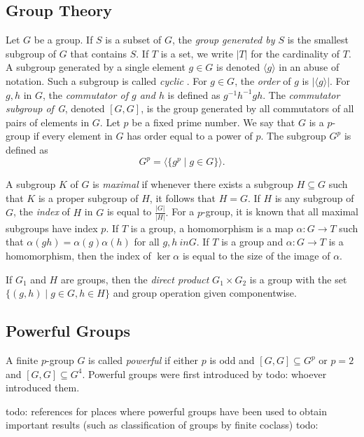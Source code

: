 \documentclass{amsart}
\numberwithin{equation} {section}
\theoremstyle{definition}
\begin{document}
\subsection{Group Theory}

Let $G$ be a group. If $S$ is a subset of $G$, the \textit{group generated by $S$} is the smallest subgroup of $G$ that contains $S$. If $T$ is a set, we write $|T|$ for the cardinality of $T$. A subgroup generated by a single element $g \in G$ is denoted $\langle g \rangle$ in an abuse of notation. Such a subgroup is called \textit{cyclic} . For $g \in G$, the \textit{order} of $g$ is $|\langle g \rangle|$.  For $g,h$ in $G$, the \textit{commutator of $g$ and $h$} is defined as $g^{-1}h^{-1}gh$. The \textit{commutator subgroup of G}, denoted $[G,G]$, is the group generated by all commutators of all pairs of elements in $G$. Let $p$ be a fixed prime number. We say that $G$ is a $p$-group if every element in $G$ has order equal to a power of $p$. The subgroup $G^p$ is defined as \[
G^p = \langle \{ g^p \mid g \in G \} \rangle.
\]

A subgroup $K$ of $G$ is \textit{maximal} if whenever there exists a subgroup $H \subseteq G$ such that $K$ is a proper subgroup of $H$, it follows that $H = G$. If $H$ is any subgroup of $G$, the \textit{index} of $H$ in $G$ is equal to $\displaystyle\frac{|G|}{|H|}.$ For a $p$-group, it is known that all maximal subgroups have index $p$. If $T$ is a group, a homomorphism is a map $\alpha: G \rightarrow T$ such that $\alpha(gh) = \alpha(g)\alpha(h)$ for all $g, h\ in G$. If $T$ is a group and $\alpha: G \rightarrow T$ is a homomorphism, then the index of $\ker \alpha$ is equal to the size of the image of $\alpha$. 

If $G_1$ and $H$ are groups, then the \textit{direct product} $G_1 \times G_2$ is a group with the set $\{ (g,h) \mid g \in G, h \in H \} $ and group operation given componentwise.

\subsection{Powerful Groups}

A finite $p$-group $G$ is called \textit{powerful} if either $p$ is odd and $[G,G]\subseteq G^p$ or $p=2$ and $[G,G]\subseteq G^4$. Powerful groups were first introduced by todo: whoever introduced them.  

todo: references for places where powerful groups have been used to obtain important results (such as classification of groups by finite coclass)
todo: 
\end{document}

